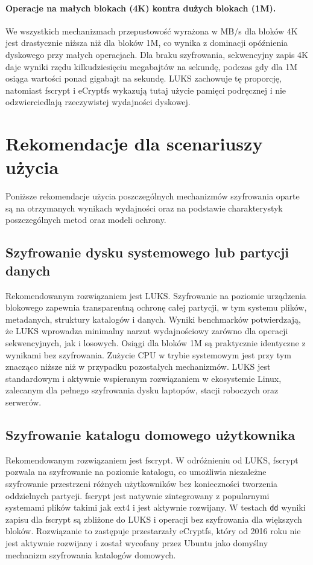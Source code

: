 \documentclass[a4paper]{article}
\begin{document}
\paragraph{Operacje na małych blokach (4K) kontra dużych blokach (1M).}
We wszystkich mechanizmach przepustowość wyrażona w MB/s dla bloków 4K jest drastycznie
niższa niż dla bloków 1M, co wynika z dominacji opóźnienia dyskowego przy małych operacjach.
Dla braku szyfrowania, sekwencyjny zapis 4K daje wyniki rzędu kilkudziesięciu megabajtów na
sekundę, podczas gdy dla 1M osiąga wartości ponad gigabajt na sekundę. LUKS zachowuje tę
proporcję, natomiast fscrypt i eCryptfs wykazują tutaj użycie pamięci podręcznej i nie
odzwierciedlają rzeczywistej wydajności dyskowej.


\section{Rekomendacje dla scenariuszy użycia}

Poniższe rekomendacje użycia poszczególnych mechanizmów szyfrowania oparte są na
otrzymanych wynikach wydajności oraz na podstawie charakterystyk poszczególnych metod oraz
modeli ochrony.

\subsection{Szyfrowanie dysku systemowego lub partycji danych}

Rekomendowanym rozwiązaniem jest LUKS. Szyfrowanie na poziomie urządzenia blokowego
zapewnia transparentną ochronę całej partycji, w tym systemu plików, metadanych, struktury
katalogów i danych. Wyniki benchmarków potwierdzają, że LUKS wprowadza minimalny narzut
wydajnościowy zarówno dla operacji sekwencyjnych, jak i losowych. Osiągi dla bloków 1M
są praktycznie identyczne z wynikami bez szyfrowania. Zużycie CPU w trybie systemowym
jest przy tym znacząco niższe niż w przypadku pozostałych mechanizmów. LUKS jest standardowym
i aktywnie wspieranym rozwiązaniem w ekosystemie Linux, zalecanym dla pełnego szyfrowania dysku
laptopów, stacji roboczych oraz serwerów.

\subsection{Szyfrowanie katalogu domowego użytkownika}

Rekomendowanym rozwiązaniem jest fscrypt. W odróżnieniu od LUKS, fscrypt pozwala
na szyfrowanie na poziomie katalogu, co umożliwia niezależne szyfrowanie przestrzeni
różnych użytkowników bez konieczności tworzenia oddzielnych partycji. fscrypt jest natywnie
zintegrowany z popularnymi systemami plików takimi jak ext4 i jest aktywnie rozwijany.
W testach \texttt{dd} wyniki zapisu dla fscrypt są zbliżone do LUKS i operacji bez szyfrowania
dla większych bloków. Rozwiązanie to zastępuje przestarzały eCryptfs, który od 2016 roku nie
jest aktywnie rozwijany i został wycofany przez Ubuntu jako domyślny mechanizm szyfrowania
katalogów domowych.
\end{document}
